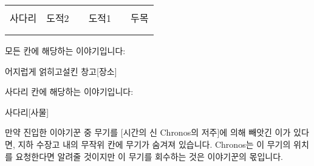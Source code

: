 \documentclass{report}
\begin{document}
	\begin{tabular}{|p{2cm}|p{2cm}|p{2cm}|p{2cm}|p{2cm}|p{2cm}|}
		\hline
		&     &  &     &  &    \\ \hline
		&     &  &     &  &    \\ \hline
		사다리 & 도적2 &  & 도적1 &  & 두목 \\ \hline
		&     &  &     &  &    \\ \hline
		&     &  &     &  &    \\ \hline
	\end{tabular}
	
	\bigskip
	
	모든 칸에 해당하는 이야기입니다:
	\begin{spoiler}{어지럽게 얽히고설킨 창고}{[장소]}
		
	\end{spoiler}
	
	\bigskip
	
	사다리 칸에 해당하는 이야기입니다:
	\begin{spoiler}{사다리}{[사물]}
	\end{spoiler}
	
	만약 진입한 이야기꾼 중 무기를 [시간의 신 Chronos의 저주]에 의해 빼앗긴 이가 있다면, 지하 수장고 내의 무작위 칸에 무기가 숨겨져 있습니다. Chronos는 이 무기의 위치를 요청한다면 알려줄 것이지만 이 무기를 회수하는 것은 이야기꾼의 몫입니다.
\end{document}
